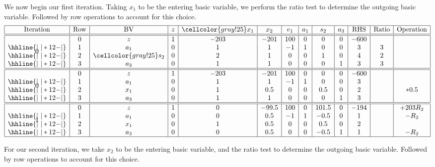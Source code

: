 \documentclass[12pt]{article}
\theoremstyle{definition}
\begin{document}
We now begin our first iteration. Taking $x_1$ to be the entering basic variable, we perform the ratio test to determine the outgoing basic variable. Followed by row operations to account for this choice.
 \[\begin{array}{*{13}{|c}|}
    \hline
    \text{Iteration} & \text{Row} & \text{BV}
        & z & \cellcolor{gray!25}x_1 & x_2 & e_1 & a_1 & s_2 & a_3
        &\text{RHS} & \text{Ratio} & \text{Operation} \\\hline\hline
    \multirow{4}*{0}
    & 0 & z   & 1 & -203 & -201 & 100 & 0 & 0 & 0  & -600 & &\\\hhline{|~|*{12}{-}|}
    & 1 & a_1 & 0 & 1  & 1  & -1 & 1 & 0 & 0 & 3 & 3 & \\\hhline{|~|*{12}{-}|}
    & 2 & \cellcolor{gray!25}s_2 & 0 & 2  & 1  & 0 & 0 & 1 & 0 & 4 & 2 & \\\hhline{|~|*{12}{-}|}
    & 3 & a_3 & 0 & 1  & 1  & 0 & 0 & 0 & 1 & 3 & 3 & \\\hline
    \hline
    \multirow{4}*{0}
    & 0 & z   & 1 & -203 & -201 & 100 & 0 & 0 & 0  & -600 & &\\\hhline{|~|*{12}{-}|}
    & 1 & a_1 & 0 & 1  & 1  & -1 & 1 & 0 & 0 & 3 &  & \\\hhline{|~|*{12}{-}|}
    & 2 & x_1 & 0 & 1  & 0.5  & 0 & 0 & 0.5 & 0 & 2 & & *0.5 \\\hhline{|~|*{12}{-}|}
    & 3 & a_3 & 0 & 1  & 1  & 0 & 0 & 0 & 1 & 3 &  & \\\hline
    \hline
    \multirow{4}*{1}
    & 0 & z   & 1 & 0 & -99.5 & 100 & 0 & 101.5 & 0  & -194 & & +203R_2\\\hhline{|~|*{12}{-}|}
    & 1 & a_1 & 0 & 0  & 0.5  & -1 & 1 & -0.5 & 0 & 1 &  & -R_2\\\hhline{|~|*{12}{-}|}
    & 2 & x_1 & 0 & 1  & 0.5  & 0 & 0 & 0.5 & 0 & 2 & &  \\\hhline{|~|*{12}{-}|}
    & 3 & a_3 & 0 & 0  & 0.5  & 0 & 0 & -0.5 & 1 & 1 &  & -R_2\\\hline
\end{array}\]

For our second iteration, we take $x_2$ to be the entering basic variable, and the ratio test to determine the outgoing basic variable. Followed by row operations to account for this choice.
\end{document}
